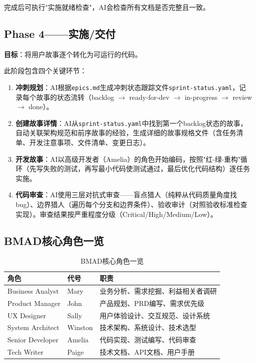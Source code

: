 完成后可执行"实施就绪检查"，AI会检查所有文档是否完整且一致。

\subsection{Phase 4——实施/交付}

\textbf{目标}：将用户故事逐个转化为可运行的代码。

此阶段包含四个关键环节：

\begin{enumerate}[leftmargin=2em]
  \item \textbf{冲刺规划}：AI根据\texttt{epics.md}生成冲刺状态跟踪文件\texttt{sprint-status.yaml}，记录每个故事的状态流转（backlog $\to$ ready-for-dev $\to$ in-progress $\to$ review $\to$ done）。
  \item \textbf{创建故事详情}：AI从\texttt{sprint-status.yaml}中找到第一个backlog状态的故事，自动关联架构规范和前序故事的经验，生成详细的故事规格文件（含任务清单、开发注意事项、文件清单、变更日志）。
  \item \textbf{开发故事}：AI以高级开发者（Amelia）的角色开始编码，按照"红-绿-重构"循环（先写失败的测试，再写最小代码使测试通过，最后优化代码结构）逐任务实施。
  \item \textbf{代码审查}：AI使用三层对抗式审查——盲点猎人（纯粹从代码质量角度找bug）、边界猎人（遍历每个分支和边界条件）、验收审计（对照验收标准检查实现）。审查结果按严重程度分级（Critical/High/Medium/Low）。
\end{enumerate}

\subsection{BMAD核心角色一览}

\begin{table}[H]
\centering
\begin{tabular}{llp{7cm}}
\toprule
\textbf{角色} & \textbf{代号} & \textbf{职责} \\
\midrule
Business Analyst & Mary & 业务分析、需求挖掘、利益相关者调研 \\
Product Manager & John & 产品规划、PRD编写、需求优先级 \\
UX Designer & Sally & 用户体验设计、交互规范、设计系统 \\
System Architect & Winston & 技术架构、系统设计、技术选型 \\
Senior Developer & Amelia & 代码实现、测试编写、代码审查 \\
Tech Writer & Paige & 技术文档、API文档、用户手册 \\
\bottomrule
\end{tabular}
\caption{BMAD核心角色一览}
\end{table}


